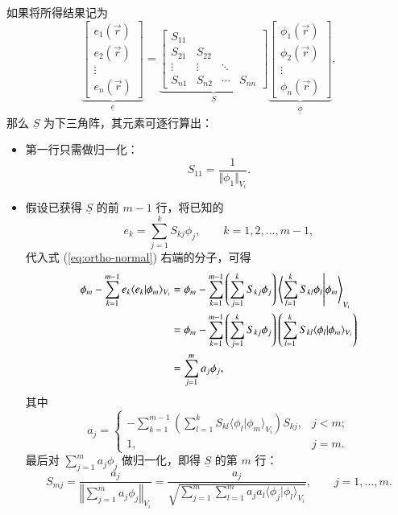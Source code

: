如果将所得结果记为
\begin{equation}
\underbrace{\begin{bmatrix}e_{1}(\vec{r})\\
e_{2}(\vec{r})\\
\vdots\\
e_{n}(\vec{r})
\end{bmatrix}}_{\underline{e}}=\underbrace{\begin{bmatrix}S_{11}\\
S_{21} & S_{22}\\
\vdots & \vdots & \ddots\\
S_{n1} & S_{n2} & \cdots & S_{nn}
\end{bmatrix}}_{\underline{S}}\underbrace{\begin{bmatrix}\phi_{1}(\vec{r})\\
\phi_{2}(\vec{r})\\
\vdots\\
\phi_{n}(\vec{r})
\end{bmatrix}}_{\underline{\phi}},
\end{equation}
那么 $\underline{S}$ 为下三角阵，其元素可逐行算出：
\begin{itemize}
\item 第一行只需做归一化：
\begin{equation}
S_{11}=\frac{1}{\Vert\phi_{1}\Vert_{V_{i}}}.
\end{equation}
\item 假设已获得 $\underline{S}$ 的前 $m-1$ 行，将已知的
\begin{equation}
e_{k}=\sum_{j=1}^{k}S_{kj}\phi_{j},\qquad k=1,2,\dots,m-1,\label{eq:partially_orthonormal}
\end{equation}
代入式 (\ref{eq:ortho-normal}) 右端的分子，可得
\begin{equation}
\begin{aligned}\phi_{m}-\sum_{k=1}^{m-1}e_{k}\langle e_{k}\vert\phi_{m}\rangle_{V_{i}} & =\phi_{m}-\sum_{k=1}^{m-1}\left(\sum_{j=1}^{k}S_{kj}\phi_{j}\right)\ip{\sum_{l=1}^{k}S_{kl}\phi_{l}}{\phi_{m}}_{V_{i}}\\
 & =\phi_{m}-\sum_{k=1}^{m-1}\left(\sum_{j=1}^{k}S_{kj}\phi_{j}\right)\left(\sum_{l=1}^{k}S_{kl}\langle\phi_{l}\vert\phi_{m}\rangle_{V_{i}}\right)\\
 & =\sum_{j=1}^{m}a_{j}\phi_{j},
\end{aligned}
\end{equation}
其中
\begin{equation}
a_{j}=\begin{cases}
-\sum_{k=1}^{m-1}\left(\sum_{l=1}^{k}S_{kl}\langle\phi_{l}\vert\phi_{m}\rangle_{V_{i}}\right)S_{kj}, & j<m;\\
1, & j=m.
\end{cases}
\end{equation}
最后对 $\sum_{j=1}^{m}a_{j}\phi_{j}$ 做归一化，即得 $\underline{S}$ 的第 $m$
行：
\begin{equation}
S_{mj}=\frac{a_{j}}{\left\Vert \sum_{j=1}^{m}a_{j}\phi_{j}\right\Vert _{V_{i}}}=\frac{a_{j}}{\sqrt{\sum_{j=1}^{m}\sum_{l=1}^{m}a_{j}a_{l}\langle\phi_{j}\vert\phi_{l}\rangle_{V_{i}}}},\qquad j=1,\dots,m.
\end{equation}
\end{itemize}

